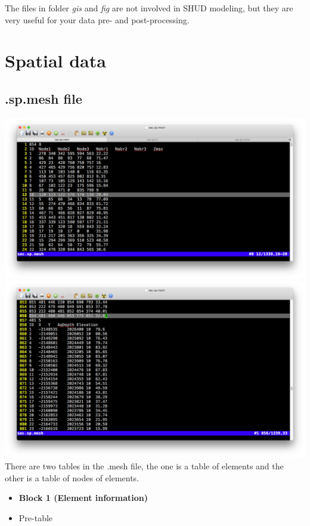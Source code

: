 \documentclass[]{scrbook}
\begin{document}
The files in folder \emph{gis} and \emph{fig} are not involved in SHUD
modeling, but they are very useful for your data pre- and
post-processing.

\section{Spatial data}\label{spatial-data}

\subsection{.sp.mesh file}\label{sp.mesh-file}

\includegraphics{Fig/IO/sp.mesh1.png}
\includegraphics{Fig/IO/sp.mesh2.png} There are two tables in the .mesh
file, the one is a table of elements and the other is a table of nodes
of elements.

\begin{itemize}
\item
  \textbf{Block 1 (Element information)}
\item
  Pre-table
\end{itemize}
\end{document}
